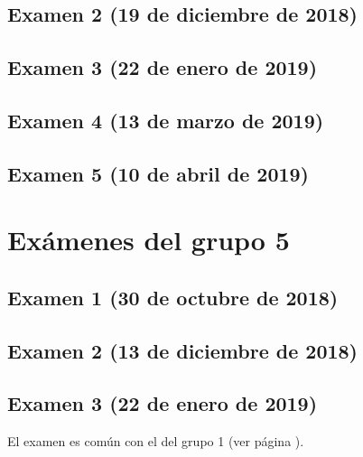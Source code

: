 \documentclass[a4paper,12pt,twoside]{book}
\begin{document}
\section{Examen 2 (19 de diciembre de 2018)}
\section{Examen 3 (22 de enero de 2019)}
 \label{examen_18_19_4_3}
\section{Examen 4 (13 de marzo de 2019)}
\section{Examen 5 (10 de abril de 2019)}
        
\chapter{Exámenes del grupo 5}
\section{Examen 1 (30 de octubre de 2018)}
\section{Examen 2 (13 de diciembre de 2018)}
\section{Examen 3 (22 de enero de 2019)}
El examen es común con el del grupo 1 (ver página \pageref{examen_18_19_1_3}).
\end{document}
